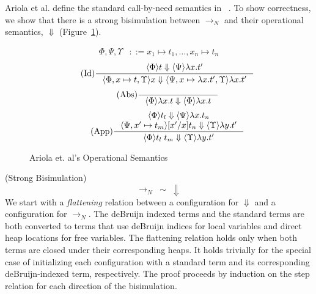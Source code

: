 Ariola et al. define the standard call-by-need semantics in
~\cite{ariola1995call}. To show correctness, we show that there is a strong
bisimulation between $\rightarrow_{N}$ and their operational
semantics, $\Downarrow$ (Figure~\ref{fig:cbn}).  

\begin{figure}
\begin{align*}
\tag{Heap} \Phi, \Psi, \Upsilon &::= x_1 \mapsto t_1, \dots, x_n \mapsto t_n
\end{align*}
\begin{align*}
\tag{Id} \inference
{\langle \Phi \rangle t \Downarrow \langle \Psi \rangle \lambda x.t'}
{\langle \Phi, x \mapsto t, \Upsilon \rangle x \Downarrow \langle \Psi, x
\mapsto \lambda x.t', \Upsilon \rangle \lambda x.t'}
\end{align*}
\begin{align*}
\tag{Abs} \inference 
{}
{\langle \Phi \rangle \lambda x . t \Downarrow \langle \Phi \rangle \lambda x.t}
\end{align*}
\begin{align*}
\tag{App} \inference
{\langle \Phi \rangle t_l \Downarrow \langle \Psi \rangle \lambda 
x.t_n \\ \langle \Psi, x' \mapsto t_m \rangle [x'/x]t_n \Downarrow \langle
\Upsilon \rangle \lambda y.t'}
{\langle \Phi \rangle t_l \; t_m \Downarrow \langle \Upsilon \rangle \lambda y.t'}
\end{align*}
\caption{Ariola et. al's Operational Semantics}
\label{fig:cbn}
\end{figure}

{\theorem \textnormal{(Strong Bisimulation)} $$\xrightarrow{}_{N} \; \sim \;
\Downarrow$$}
We start with a \emph{flattening} relation between a configuration for
$\Downarrow$ and a configuration for $\xrightarrow{}_{N}$. The deBruijn indexed
terms and the standard terms are both converted to terms that use deBruijn
indices for local variables and direct heap locations for free variables. The
flattening relation holds only when both terms are closed under their
corresponding heaps. It holds trivially for the special case of initializing
each configuration with a standard term and its corresponding deBruijn-indexed
term, respectively. The proof proceeds by induction on the step relation for
each direction of the bisimulation.

